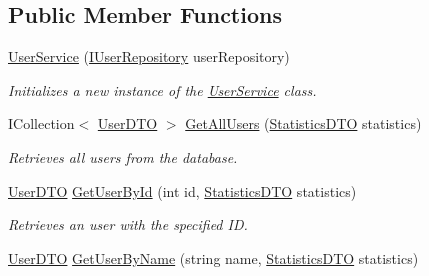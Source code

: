 \subsection*{Public Member Functions}
\begin{DoxyCompactItemize}
\item 
\mbox{\hyperlink{class_gielda_l2_1_1_i_n_f_r_a_s_t_r_u_c_t_u_r_e_1_1_services_1_1_user_service_a0aab5959c1782b51e9343faae0b76305}{User\+Service}} (\mbox{\hyperlink{interface_gielda_l2_1_1_d_b_1_1_interfaces_1_1_i_user_repository}{I\+User\+Repository}} user\+Repository)
\begin{DoxyCompactList}\small\item\em Initializes a new instance of the \mbox{\hyperlink{class_gielda_l2_1_1_i_n_f_r_a_s_t_r_u_c_t_u_r_e_1_1_services_1_1_user_service}{User\+Service}} class. \end{DoxyCompactList}\item 
I\+Collection$<$ \mbox{\hyperlink{class_gielda_l2_1_1_i_n_f_r_a_s_t_r_u_c_t_u_r_e_1_1_d_t_o_1_1_user_d_t_o}{User\+D\+TO}} $>$ \mbox{\hyperlink{class_gielda_l2_1_1_i_n_f_r_a_s_t_r_u_c_t_u_r_e_1_1_services_1_1_user_service_a448582ca4e54e603f4dd8a5a12c4bed4}{Get\+All\+Users}} (\mbox{\hyperlink{class_gielda_l2_1_1_i_n_f_r_a_s_t_r_u_c_t_u_r_e_1_1_d_t_o_1_1_statistics_d_t_o}{Statistics\+D\+TO}} statistics)
\begin{DoxyCompactList}\small\item\em Retrieves all users from the database. \end{DoxyCompactList}\item 
\mbox{\hyperlink{class_gielda_l2_1_1_i_n_f_r_a_s_t_r_u_c_t_u_r_e_1_1_d_t_o_1_1_user_d_t_o}{User\+D\+TO}} \mbox{\hyperlink{class_gielda_l2_1_1_i_n_f_r_a_s_t_r_u_c_t_u_r_e_1_1_services_1_1_user_service_a92394250a4617bc33dce562feabb6296}{Get\+User\+By\+Id}} (int id, \mbox{\hyperlink{class_gielda_l2_1_1_i_n_f_r_a_s_t_r_u_c_t_u_r_e_1_1_d_t_o_1_1_statistics_d_t_o}{Statistics\+D\+TO}} statistics)
\begin{DoxyCompactList}\small\item\em Retrieves an user with the specified ID. \end{DoxyCompactList}\item 
\mbox{\hyperlink{class_gielda_l2_1_1_i_n_f_r_a_s_t_r_u_c_t_u_r_e_1_1_d_t_o_1_1_user_d_t_o}{User\+D\+TO}} \mbox{\hyperlink{class_gielda_l2_1_1_i_n_f_r_a_s_t_r_u_c_t_u_r_e_1_1_services_1_1_user_service_aea2901aafb86692c9aa8efa24b8801ee}{Get\+User\+By\+Name}} (string name, \mbox{\hyperlink{class_gielda_l2_1_1_i_n_f_r_a_s_t_r_u_c_t_u_r_e_1_1_d_t_o_1_1_statistics_d_t_o}{Statistics\+D\+TO}} statistics)

\end{DoxyCompactItemize}

